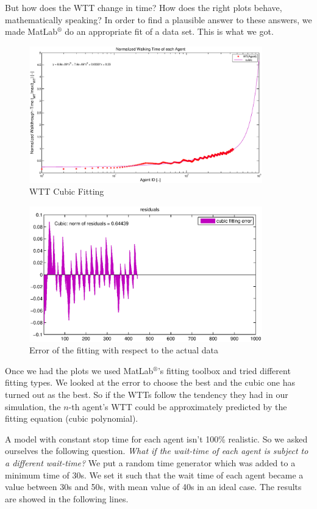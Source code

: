 \documentclass[11pt]{article}
\begin{document}
But how does the WTT change in time? How does the right plots behave, mathematically speaking? In order to find a plausible answer to these answers, we made MatLab$^{®}$ do an appropriate fit of  a data set. This is what we got.

\begin{figure}[h]
 	\centering
		\includegraphics[width = 0.9\textwidth]{Images/walkingTimeFitting.eps}
 	\caption{WTT Cubic Fitting}
  	\label{CubicFitting}
\end{figure}
\begin{figure}
  	\centering
   		 \includegraphics[width = 0.9\textwidth]{Images/cubingFittingError.eps}
  	\caption{Error of the fitting with respect to the actual data}
  	\label{FittingError}
\end{figure}

Once we had the plots we used MatLab$^{®}$'s fitting toolbox and tried different fitting types. We looked at the error to choose the best and the cubic one has turned out as the best. So if the WTTs follow the tendency they had in our simulation, the $n$-th agent's WTT could be approximately predicted by the fitting equation (cubic polynomial).

A model with constant stop time for each agent isn't 100\% realistic. So we asked ourselves the following question.
\emph{What if the wait-time of each agent is subject to a different wait-time?} We put a random time generator which was added to a minimum time of 30s. We set it such that the wait time of each agent became a value between 30s and 50s, with mean value of 40s in an ideal case. The results are showed in the following lines.
\end{document}
